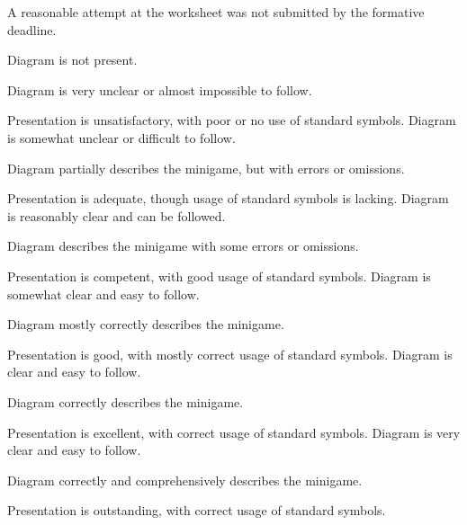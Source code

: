 \documentclass{../../../fal_assignment}
\begin{document}
\rubrichead{\ }
\begin{markingrubric}
		\grade\fail	A reasonable attempt at the worksheet was not submitted by the formative deadline.
		
        \grade\fail Diagram is not present.
			\par Diagram is very unclear or almost impossible to follow.
			\par Presentation is unsatisfactory, with poor or no use of standard symbols.
        \grade Diagram is somewhat unclear or difficult to follow.
			\par Diagram partially describes the minigame, but with errors or omissions.
			\par Presentation is adequate, though usage of standard symbols is lacking.
        \grade Diagram is reasonably clear and can be followed.
			\par Diagram describes the minigame with some errors or omissions.
			\par Presentation is competent, with good usage of standard symbols.
        \grade Diagram is somewhat clear and easy to follow.
			\par Diagram mostly correctly describes the minigame.
			\par Presentation is good, with mostly correct usage of standard symbols.
        \grade Diagram is clear and easy to follow.
			\par Diagram correctly describes the minigame.
			\par Presentation is excellent, with correct usage of standard symbols.
        \grade Diagram is very clear and easy to follow.
			\par Diagram correctly and comprehensively describes the minigame.
			\par Presentation is outstanding, with correct usage of standard symbols.


\end{markingrubric}
\end{document}
